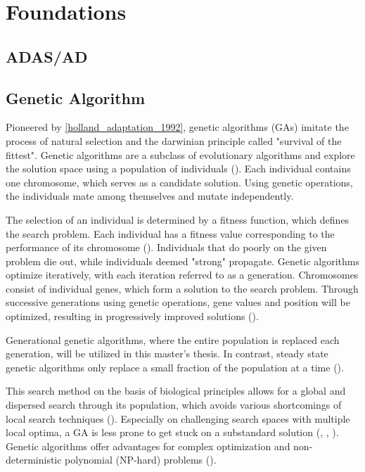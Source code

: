 \chapter{Foundations}
\label{chap:foundation}

\section{ADAS/AD}


\section{Genetic Algorithm}
\label{chap:foundation:genetic_algorithm}

Pioneered by \ref{holland_adaptation_1992}, genetic algorithms (GAs) imitate the process of natural selection and the darwinian principle called "survival of the fittest". Genetic algorithms are a subclass of evolutionary algorithms and explore the solution space using a population of individuals (\cite{mills_determining_2015}). Each individual contains one chromosome, which serves as a candidate solution. Using genetic operations, the individuals mate among themselves and mutate independently. 

The selection of an individual is determined by a fitness function, which defines the search problem. Each individual has a fitness value corresponding to the performance of its chromosome (\cite{majumdar_genetic_2015}). Individuals that do poorly on the given problem die out, while individuals deemed "strong" propagate. Genetic algorithms optimize iteratively, with each iteration referred to as a generation. Chromosomes consist of individual genes, which form a solution to the search problem. Through successive generations using genetic operations, gene values and position will be optimized, resulting in progressively improved solutions (\cite{srinivas_genetic_1994}).

Generational genetic algorithms, where the entire population is replaced each generation, will be utilized in this master's thesis. In contrast, steady state genetic algorithms only replace a small fraction of the population at a time (\cite{srinivas_genetic_1994}).

This search method on the basis of biological principles allows for a global and dispersed search through its population, which avoids various shortcomings of local search techniques (\cite{grefenstette_optimization_1986}). Especially on challenging search spaces with multiple local optima, a GA is less prone to get stuck on a substandard solution (\cite{katoch_review_2021}, \cite{xia_genetic_2019}, \cite{majumdar_genetic_2015}). Genetic algorithms offer advantages for complex optimization and non-deterministic polynomial (NP-hard) problems (\cite{hussain_trade-off_2020}).


